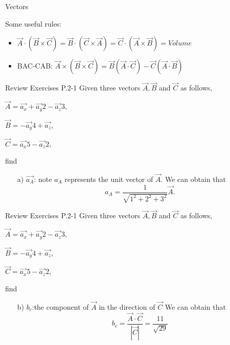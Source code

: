 \documentclass[xcolor={dvipsnames}]{beamer}
\begin{document}
\begin{frame}{Vectors}
\begin{block}{Some useful rules:}
\begin{itemize}
	\item $\vec{A}\cdot(\vec{B}\times\vec{C}) = \vec{B}\cdot(\vec{C}\times\vec{A}) = \vec{C}\cdot(\vec{A}\times\vec{B}) = Volume$
    \item BAC-CAB:
        $\vec{A}\times(\vec{B}\times\vec{C}) = \vec{B}(\vec{A}\cdot\vec{C}) - \vec{C}(\vec{A}\cdot\vec{B})$
\end{itemize}
\end{block}


\end{frame}
\begin{frame}{Review Exercises}
P.2-1 Given three vectors $\vec{A},\vec{B}$ and $\vec{C}$ as follows,
    
    $\vec{A}=\vec{a_x}+\vec{a_y}2-\vec{a_z}3$,

    $\vec{B}=-\vec{a_y}4+\vec{a_z}$,

    $\vec{C}=\vec{a_x}5-\vec{a_z}2$,

    find
    \begin{itemize}
        \item[a)] $\vec{a_A}$: note $a_A$ represents the unit vector of $\vec{A}$.
        \break
        \pause
        We can obtain that
        $$a_{A}=\frac{1}{\sqrt{1^2+2^2+3^2}}\vec{A}.$$
    \end{itemize}

\end{frame}
\begin{frame}{Review Exercises}
P.2-1 Given three vectors $\vec{A},\vec{B}$ and $\vec{C}$ as follows,
    
    $\vec{A}=\vec{a_x}+\vec{a_y}2-\vec{a_z}3$,

    $\vec{B}=-\vec{a_y}4+\vec{a_z}$,

    $\vec{C}=\vec{a_x}5-\vec{a_z}2$,

    find
    \begin{itemize}
        \item[b)] $b_{c}$:the component of $\vec{A}$ in the direction of $\vec{C}$
        \break
        \pause
        We can obtain that
        $$b_{c}=\frac{\vec{A}\cdot\vec{C}}{|\vec{C}|}=\frac{11}{\sqrt{29}}$$
    \end{itemize}
\end{frame}
\end{document}
